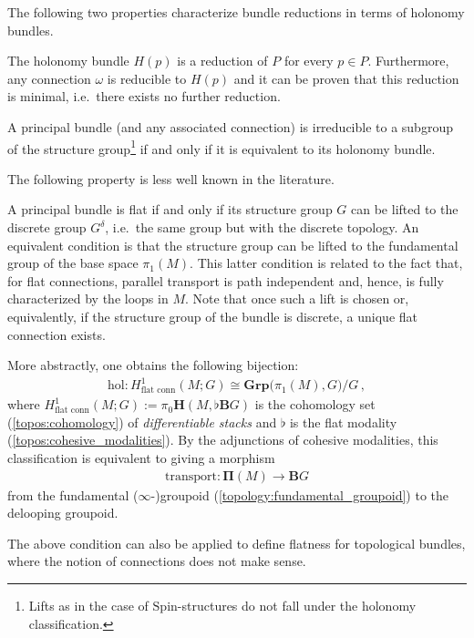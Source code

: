     The following two properties characterize bundle reductions in terms of holonomy bundles.
    \begin{property}
        The holonomy bundle $H(p)$ is a reduction of $P$ for every $p\in P$. Furthermore, any connection $\omega$ is reducible to $H(p)$ and it can be proven that this reduction is minimal, i.e.~there exists no further reduction.
    \end{property}
    \begin{result}\label{bundle:reducible_holonomy}
        A principal bundle (and any associated connection) is irreducible to a subgroup of the structure group\footnote{Lifts as in the case of $\mathrm{Spin}$-structures do not fall under the holonomy classification.} if and only if it is equivalent to its holonomy bundle.
    \end{result}

    The following property is less well known in the literature.
    \begin{property}\label{bundle:flat_connection_cohomology}
        A principal bundle is flat if and only if its structure group $G$ can be lifted to the discrete group $G^\delta$, i.e.~the same group but with the discrete topology. An equivalent condition is that the structure group can be lifted to the fundamental group of the base space $\pi_1(M)$. This latter condition is related to the fact that, for flat connections, parallel transport is path independent and, hence, is fully characterized by the loops in $M$. Note that once such a lift is chosen or, equivalently, if the structure group of the bundle is discrete, a unique flat connection exists.

        More abstractly, one obtains the following bijection:
        \begin{gather}
            \mathrm{hol}:H_{\text{flat conn}}^1(M;G)\cong\mathbf{Grp}\bigl(\pi_1(M),G\bigr)/G\,,
        \end{gather}
        where $H_{\text{flat conn}}^1(M;G):=\pi_0\mathbf{H}(M,\flat\mathbf{B}G)$ is the cohomology set (\cref{topos:cohomology}) of \textit{differentiable stacks} and $\flat$ is the flat modality (\cref{topos:cohesive_modalities}). By the adjunctions of cohesive modalities, this classification is equivalent to giving a morphism
        \begin{gather}
            \mathrm{transport}:\symbf{\Pi}(M)\rightarrow\mathbf{B}G
        \end{gather}
        from the fundamental ($\infty$-)groupoid (\cref{topology:fundamental_groupoid}) to the delooping groupoid.
    \end{property}
    \begin{remark}
        The above condition can also be applied to define flatness for topological bundles, where the notion of connections does not make sense.
    \end{remark}

